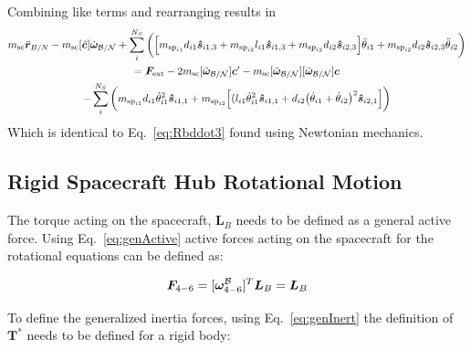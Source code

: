 \documentclass[paper]{aiaaNew}
\begin{document}
Combining like terms and rearranging results in
\begin{multline}
m_{\text{sc}} \ddot{\bm r}_{B/N} -m_{\textnormal{sc}} [\tilde{\bm{c}}]\dot{\bm\omega}_{\cal B/N} 
+ \sum\limits_{i}^{N_S} \bigg( \Big[m_{\text{sp}_{i1}} d_{i1} \bm{\hat{s}}_{i1,3} + m_{\text{sp}_{i2}} l_{i1} \bm{\hat{s}}_{i1,3} +m_{\text{sp}_{i2}} d_{i2} \bm{\hat{s}}_{i2,3}\Big] \ddot{\theta}_{i1} 
+ m_{\text{sp}_{i2}}d_{i2} \bm{\hat{s}}_{i2,3} \ddot{\theta}_{i2} \bigg) \\
= \bm F_{\text{ext}} - 2 m_{\textnormal{sc}}[\tilde{\bm\omega}_{\cal B/N}]\bm{c}' - m_{\textnormal{sc}} [\tilde{\bm\omega}_{\cal B/N}][\tilde{\bm\omega}_{\cal B/N}]\bm{c} \\- \sum\limits_{i}^{N_S} \bigg( m_{\text{sp}_{i1}} d_{i1} \dot{\theta}_{i1}^2 \bm{\hat{s}}_{i1,1} + m_{\text{sp}_{i2}} \Big[(l_{i1} \dot{\theta}_{i1}^2 \bm{\hat{s}}_{i1,1} + d_{i2}\big(\dot{\theta}_{i1} + \dot{\theta}_{i2}\big)^2\bm{\hat{s}}_{i2,1} \Big]\bigg)
\end{multline}
Which is identical to Eq.~\eqref{eq:Rbddot3} found using Newtonian mechanics.
\subsection{Rigid Spacecraft Hub Rotational Motion}

The torque acting on the spacecraft, $\bm L_B$ needs to be defined as a general active force. Using Eq.~\eqref{eq:genActive} active forces acting on the spacecraft for the rotational equations can be defined as:

\begin{equation}
\bm F_{4-6} = [\bm \omega_{4-6}^{\cal{B}}]^T \bm L_B = \bm L_B
\end{equation}

To define the generalized inertia forces, using Eq.~\eqref{eq:genInert} the definition of $\bm T^*$ needs to be defined for a rigid body:
\end{document}
